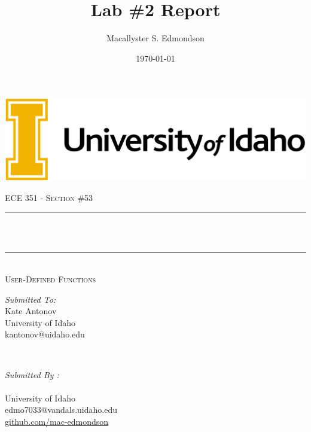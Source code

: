 \documentclass[12pt]{report}
\title{Lab \#2 Report}
\author{Macallyster S. Edmondson}
\date{\today}
\makeatletter
\let\thetitle\@title
\let\theauthor\@author
\makeatother
\begin{document}
\begin{titlepage}\thispagestyle{titlepage}
\centering
\includegraphics[scale = 0.12]{univ-logo.png}\\[1.0 cm]
\begin{center}    \textsc{\Large   ECE 351 - Section \#53 }\\[2.0 cm]
\end{center}%

\rule{\linewidth}{0.2 mm} \\[0.4 cm]
{ \huge \bfseries \thetitle}\\
\rule{\linewidth}{0.2 mm} \\[0.5 cm]
\textsc{\Large User-Defined Functions }\\[1.5 cm] %
\begin{minipage}{0.4\textwidth}
\begin{flushleft} \large
\emph{Submitted To:}\\
Kate Antonov\\ \small
University of Idaho\\
kantonov@uidaho.edu\\
\hfill
\end{flushleft}
\end{minipage}~
\begin{minipage}{0.4\textwidth}
\begin{flushright} \large
\emph{Submitted By :} \\
\theauthor \\ \small
University of Idaho\\
edmo7033@vandals.uidaho.edu\\
\href{http://github.com/mac-edmondson}{github.com/mac-edmondson}\\
\end{flushright}
\end{minipage}\\[2 cm]
\vfill
\end{titlepage}
\tableofcontents\thispagestyle{customplain}
\pagebreak
\renewcommand{\thesection}{\arabic{section}}
\end{document}
